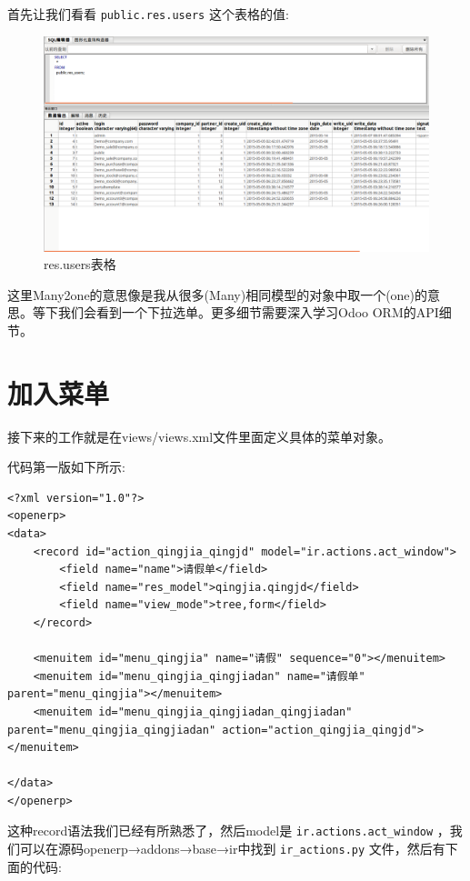 \documentclass[11pt,a4paper]{sphinxmanual}
\begin{document}
首先让我们看看 \verb~public.res.users~ 这个表格的值:

\begin{figure}[H]
\centering
\includegraphics[keepaspectratio,max width=0.95\linewidth]{images/res.users表格.png}
\caption{res.users表格}
\end{figure}

这里Many2one的意思像是我从很多(Many)相同模型的对象中取一个(one)的意思。等下我们会看到一个下拉选单。更多细节需要深入学习Odoo ORM的API细节。



\section{加入菜单}
\label{sec-6-3}
接下来的工作就是在views/views.xml文件里面定义具体的菜单对象。

代码第一版如下所示:
\begin{Verbatim}
<?xml version="1.0"?>
<openerp>
<data>
    <record id="action_qingjia_qingjd" model="ir.actions.act_window">
        <field name="name">请假单</field>
        <field name="res_model">qingjia.qingjd</field>
        <field name="view_mode">tree,form</field>
    </record>

    <menuitem id="menu_qingjia" name="请假" sequence="0"></menuitem>
    <menuitem id="menu_qingjia_qingjiadan" name="请假单" parent="menu_qingjia"></menuitem>
    <menuitem id="menu_qingjia_qingjiadan_qingjiadan" parent="menu_qingjia_qingjiadan" action="action_qingjia_qingjd"></menuitem>

</data>
</openerp>
\end{Verbatim}

这种record语法我们已经有所熟悉了，然后model是 \verb~ir.actions.act_window~ ，我们可以在源码openerp→addons→base→ir中找到 \verb~ir_actions.py~ 文件，然后有下面的代码:
\end{document}
